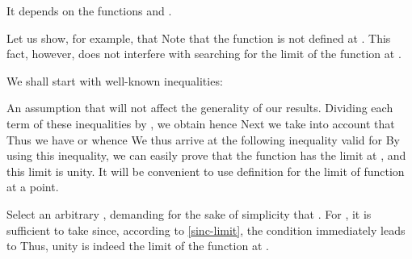 \begin{p}
It depends on the functions  and .

Let us show, for example, that 
Note that the function  is not defined at . This fact, however, does not interfere with searching for the limit of the function at .

We shall start with well-known inequalities: 

An assumption that  will not affect the generality of our results. Dividing each term of these inequalities by , we obtain 
hence
Next we take into account that
Thus we have
or 
whence
We thus arrive at the following inequality valid for 
By using this inequality, we can easily prove that the function  has the limit at , and this limit is unity. It will be convenient to use definition  for the limit of function at a point.

Select an arbitrary , demanding for the sake of simplicity that . For \hlm{$\delta$}, it is sufficient to take \hlm{$\delta  =	\varepsilon$}  since, according to \eqref{sinc-limit}, the condition  immediately leads to 
Thus, unity is indeed the limit of the function  at . 
\end{p}



